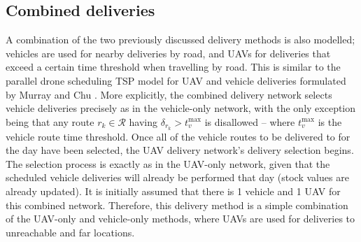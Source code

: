 \subsection{Combined deliveries}
\label{sec:meth_combo_dels}
A combination of the two previously discussed delivery methods is also modelled; vehicles are used for nearby deliveries by road, and UAVs for deliveries that exceed a certain time threshold when travelling by road. This is similar to the parallel drone scheduling TSP model for UAV and vehicle deliveries formulated by Murray and Chu \cite{murray2015flying}.
More explicitly, the combined delivery network selects vehicle deliveries precisely as in the vehicle-only network, with the only exception being that any route $r_{k} \in \mathcal{R}$ having $\delta_{r_{k}} > t_{v}^{\text{max}}$ is disallowed -- where $t_{v}^{\text{max}}$ is the vehicle route time threshold. Once all of the vehicle routes to be delivered to for the day have been selected, the UAV delivery network's delivery selection begins. The selection process is exactly as in the UAV-only network, given that the scheduled vehicle deliveries will already be performed that day (stock values are already updated). It is initially assumed that there is 1 vehicle and 1 UAV for this combined network. Therefore, this delivery method is a simple combination of the UAV-only and vehicle-only methods, where UAVs are used for deliveries to unreachable and far locations.

